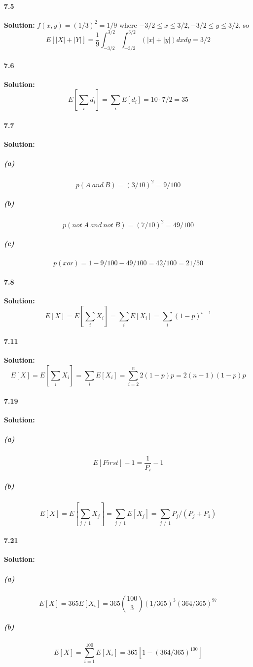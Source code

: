 \documentclass[11pt]{article}
\begin{document}
	\paragraph{7.5}\textbf{Solution:}
			$f(x,y) = (1/3)^2 = 1/9$ where $-3/2\leq x \leq 3/2, -3/2\leq y \leq 3/2$, so \[E[|X| + |Y|] = \frac{1}{9}\int^{3/2}_{-3/2}\int^{3/2}_{-3/2}(|x| + |y|)dxdy = 3/2\]
	\paragraph{7.6}\textbf{Solution:}
		\[E[\sum_i d_i] = \sum_i E[d_i] = 10 \cdot 7/2 = 35\]
	\paragraph{7.7}\textbf{Solution:}
		\subparagraph{(a)}
			\[p(A\ and\ B) = (3/10)^2 = 9/100\]
		\subparagraph{(b)}
			\[p(not\ A\ and\ not\ B) = (7/10)^2 = 49/100\]
		\subparagraph{(c)}
			\[p(xor) = 1 - 9/100 - 49/100 = 42/100 = 21/50\]
	\paragraph{7.8}\textbf{Solution:}
		\[E[X] = E[\sum_i X_i] = \sum_i E[X_i] = \sum_i (1 - p)^{i - 1}\]
	\paragraph{7.11}\textbf{Solution:}
		\[E[X] = E[\sum_i X_i] = \sum_i E[X_i] = \sum_{i = 2}^n 2(1 - p)p = 2(n - 1)(1 - p)p\]
	\paragraph{7.19}\textbf{Solution:}
		\subparagraph{(a)}
			\[E[First] - 1 = \frac{1}{P_i} - 1\]
		\subparagraph{(b)}
			\[E[X] = E[\sum_{j \neq 1}X_j] = \sum_{j \neq 1}E[X_j] = \sum_{j \neq 1} P_j / (P_j + P_1)\]			
	\paragraph{7.21}\textbf{Solution:}
		\subparagraph{(a)}
			\[E[X] = 365E[X_i] = 365\binom{100}{3}(1/365)^3(364/365)^{97}\]
		\subparagraph{(b)}
			\[E[X] = \sum_{i = 1}^{100} E[X_i] = 365[1 - (364/365)^{100}]\]
\end{document}
